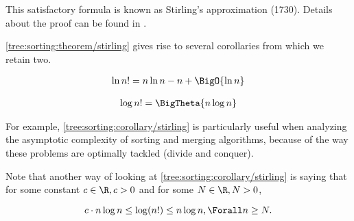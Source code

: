 This satisfactory formula is known as Stirling's approximation (1730). Details
about the proof can be found in \citet*{feller1967direct}.

\ref{tree:sorting:theorem/stirling} gives rise to several corollaries from
which we retain two.

\begin{corollary}
\begin{align*}
\ln n! &= n \ln n - n + \BigO{\ln n}\\
\end{align*}
\end{corollary}

\begin{corollary}
\label{tree:sorting:corollary/stirling}
\begin{align*}
\log n! &= \BigTheta{n \log n}\\
\end{align*}
\end{corollary}


For example, \ref{tree:sorting:corollary/stirling} is particularly useful
when analyzing the asymptotic complexity of sorting and merging algorithms, because
of the way these problems are optimally tackled (divide and conquer).

Note that another way of looking at \ref{tree:sorting:corollary/stirling} is
saying that for some constant $c \in \R, c > 0$ and for some $N \in \R, N > 0$,

\begin{displaymath}
c \cdot n \log n \leq \log(n!) \leq n \log n, \Forall n \geq N.
\end{displaymath}


